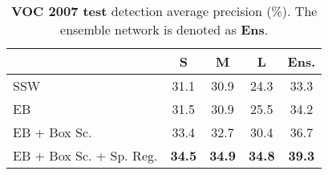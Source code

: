  \begin{table}
\begin{center}
\begin{tabular}{lccc|c}
& \textbf{S} & \textbf{M} & \textbf{L} & \textbf{Ens.}\\
\toprule
SSW                                       & 31.1 & 30.9 & 24.3 & 33.3 \\
EB                                        & 31.5 & 30.9 & 25.5 & 34.2 \\
EB + Box Sc. & 33.4 & 32.7 & 30.4 & 36.7\\
EB + Box Sc. + Sp. Reg.        & \bf{34.5} & \bf{34.9} & \bf{34.8} & \bf{39.3} \\
\end{tabular}
\vspace{0.2em}
\caption{{\bf VOC 2007 test} detection average precision (\%). The ensemble network is denoted as \textbf{Ens}.}
 \label{tab:voc2007base}
\end{center}
\end{table}


